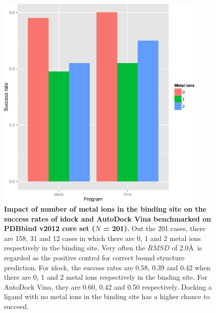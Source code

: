 \documentclass[10pt]{article}
\begin{document}
\begin{figure}[!ht]
\begin{center}
\includegraphics[width=4in]{../istar/Program-NIONS.eps}
\end{center}
\caption{
{\bf Impact of number of metal ions in the binding site on the success rates of idock and AutoDock Vina benchmarked on PDBbind v2012 core set ($N$ = 201).} Out the 201 cases, there are 158, 31 and 12 cases in which there are 0, 1 and 2 metal ions respectively in the binding site. Very often the $RMSD$ of 2.0\AA\ is regarded as the positive control for correct bound structure prediction. For idock, the success rates are 0.58, 0.39 and 0.42 when there are 0, 1 and 2 metal ions respectively in the binding site. For AutoDock Vina, they are 0.60, 0.42 and 0.50 respectively. Docking a ligand with no metal ions in the binding site has a higher chance to succeed.
}
\label{Program-NIONS}
\end{figure}
\end{document}
